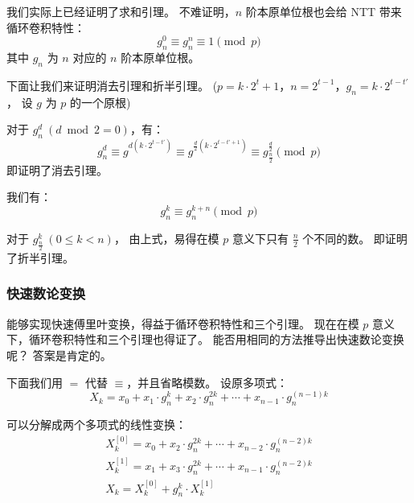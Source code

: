 \documentclass[12pt, UTF8]{article}
\begin{document}

    \bigskip
    我们实际上已经证明了求和引理。
    不难证明，$n$ 阶本原单位根也会给 NTT 带来循环卷积特性：
    \begin{equation*}
        g_n^0 \equiv g_n^n \equiv 1 \pmod {p}
    \end{equation*}
    其中 $g_n$ 为 $n$ 对应的 $n$ 阶本原单位根。

    \bigskip
    下面让我们来证明消去引理和折半引理。
    ($p = k · 2^t + 1$，$n = 2^{t - 1}$，$g_n = k · 2^{t - t'}$，
    设 $g$ 为 $p$ 的一个原根)

    对于 $g_n^d ~ (d \bmod 2 = 0)$，有：
    \begin{equation*}
        g_n^d \equiv g^{d (k · 2^{t - t'})}
        \equiv g^{\frac {d} {2} (k · 2^{t - t' + 1})}
        \equiv g_{\frac {n} {2}}^{\frac {d} {2}}
        \pmod {p}
    \end{equation*}
    即证明了消去引理。

    \bigskip
    我们有：
    \begin{equation*}
        g_n^k \equiv g_n^{k + n} \pmod {p}
    \end{equation*}

    对于 $g_{\frac {n} {2}}^{k} ~ (0 \le k < n)$，
    由上式，易得在模 $p$ 意义下只有 $\frac {n} {2}$ 个不同的数。
    即证明了折半引理。

    \subsubsection{快速数论变换}	
    能够实现快速傅里叶变换，得益于循环卷积特性和三个引理。
    现在在模 $p$ 意义下，循环卷积特性和三个引理也得证了。
    能否用相同的方法推导出快速数论变换呢？
    答案是肯定的。

    \bigskip
    下面我们用 $=$ 代替 $\equiv$，并且省略模数。
    设原多项式：
    \begin{equation*}
        X_k = x_0 + x_1 · g_n^{k} + x_2 · g_n^{2k} +
        \cdots + x_{n - 1} · g_n^{(n - 1)k}
    \end{equation*}

    可以分解成两个多项式的线性变换：
    \begin{gather*}
        X_k^{[0]} = x_0 + x_2 · g_n^{2k} + \cdots 
        + x_{n - 2} · g_n^{(n - 2)k}
        \\
        X_k^{[1]} = x_1 + x_3 · g_n^{2k} + \cdots 
        + x_{n - 1} · g_n^{(n - 2)k}
        \\
        X_k = X_k^{[0]} + g_n^k · X_k^{[1]}
    \end{gather*}
\end{document}
